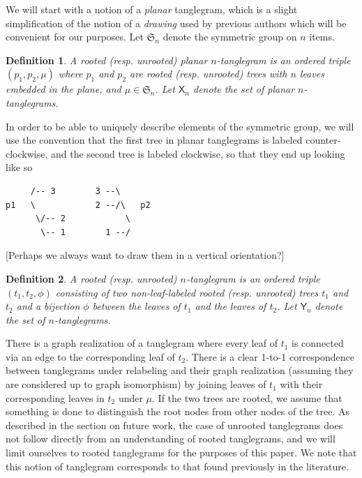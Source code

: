 \documentclass{amsart}
\newtheorem{definition}{Definition}
\newcommand{\fS}{\mathfrak S}
\newcommand{\pairing}{\mu}
\newcommand{\ptangle}{\mathsf{X}}
\newcommand{\tangle}{\mathsf{Y}}
\begin{document}
We will start with a notion of a \emph{planar} tanglegram, which is a slight simplification of the notion of a \emph{drawing} used by previous authors \cite{Venkatachalam2010-zh} which will be convenient for our purposes.
Let $\fS_n$ denote the symmetric group on $n$ items.
\begin{definition}
\label{def:ptanglegram}
A rooted (resp. unrooted) \emph{planar $n$-tanglegram} is an ordered triple $(p_1, p_2, \pairing)$ where $p_1$ and $p_2$ are rooted (resp. unrooted) trees with $n$ leaves embedded in the plane, and $\pairing \in \fS_n$.
Let $\ptangle_n$ denote the set of planar $n$-tanglegrams.
\end{definition}

In order to be able to uniquely describe elements of the symmetric group, we will use the convention that the first tree in planar tanglegrams is labeled counter-clockwise, and the second tree is labeled clockwise, so that they end up looking like so

\begin{verbatim}
     /-- 3        3 --\
p1   \            2 --/\   p2
      \/-- 2            \
       \-- 1        1 --/
\end{verbatim}

[Perhaps we always want to draw them in a vertical orientation?]

\begin{definition}
\label{def:tanglegram}
A rooted (resp. unrooted) $n$-\emph{tanglegram} is an ordered triple $(t_1, t_2, \phi)$ consisting of two non-leaf-labeled rooted (resp. unrooted) trees $t_1$ and $t_2$ and a bijection $\phi$ between the leaves of $t_1$ and the leaves of $t_2$.
Let $\tangle_n$ denote the set of $n$-tanglegrams.
\end{definition}
There is a graph realization of a tanglegram where every leaf of $t_1$ is connected via an edge to the corresponding leaf of $t_2$.
There is a clear 1-to-1 correspondence between tanglegrams under relabeling and their graph realization (assuming they are considered up to graph isomorphism) by joining leaves of $t_1$ with their corresponding leaves in $t_2$ under $\pairing$.
If the two trees are rooted, we assume that something is done to distinguish the root nodes from other nodes of the tree.
As described in the section on future work, the case of unrooted tanglegrams does not follow directly from an understanding of rooted tanglegrams, and we will limit ourselves to rooted tanglegrams for the purposes of this paper.
We note that this notion of tanglegram corresponds to that found previously in the literature.
\end{document}

